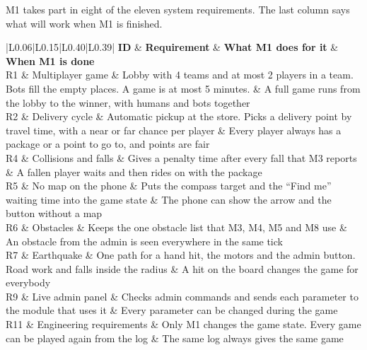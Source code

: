 \documentclass[
  english,
  10pt,
  a4paper,
]{article}
\newcommand{\ckkeep}[1]{\par\noindent\begin{minipage}{\linewidth}\setlength{\parskip}{4pt}#1\end{minipage}\par\smallskip}
\begin{document}
\ckkeep{%
M1 takes part in eight of the eleven system requirements. The last column says what will work when
M1 is finished.

\begin{tabular}{|L{0.06}|L{0.15}|L{0.40}|L{0.39}|}
\hline \textbf{ID} & \textbf{Requirement} & \textbf{What M1 does for it} & \textbf{When M1 is done} \\ \hline 
R1 & Multiplayer game & Lobby with 4 teams and at most 2 players in a team. Bots fill the empty places. A game is at most 5 minutes. & A full game runs from the lobby to the winner, with humans and bots together \\ \hline
R2 & Delivery cycle & Automatic pickup at the store. Picks a delivery point by travel time, with a near or far chance per player & Every player always has a package or a point to go to, and points are fair \\ \hline
R4 & Collisions and falls & Gives a penalty time after every fall that M3 reports & A fallen player waits and then rides on with the package \\ \hline
R5 & No map on the phone & Puts the compass target and the ``Find me'' waiting time into the game state & The phone can show the arrow and the button without a map \\ \hline
R6 & Obstacles & Keeps the one obstacle list that M3, M4, M5 and M8 use & An obstacle from the admin is seen everywhere in the same tick \\ \hline
R7 & Earthquake & One path for a hand hit, the motors and the admin button. Road work and falls inside the radius & A hit on the board changes the game for everybody \\ \hline
R9 & Live admin panel & Checks admin commands and sends each parameter to the module that uses it & Every parameter can be changed during the game \\ \hline
R11 & Engineering requirements & Only M1 changes the game state. Every game can be played again from the log & The same log always gives the same game \\ \hline
\end{tabular}}

\end{document}
